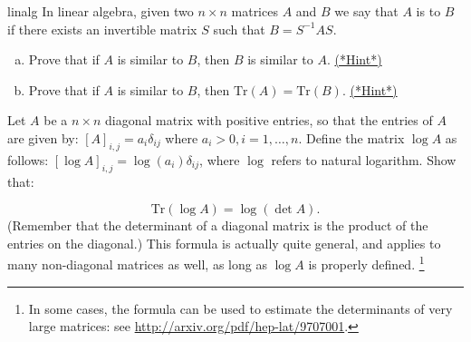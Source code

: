 \begin{exercise}{linalg}
In linear algebra, given two $n \times n$ matrices $A$ and $B$ we say that $A$ is  to $B$ if there exists an invertible matrix $S$ such that $B = S^{-1}AS$. 
\begin{enumerate}[(a)]
\item
Prove that if $A$ is similar to $B$, then $B$ is similar to $A$.
\hyperref[sec:sigma:hints]{(*Hint*)} 
\item
Prove that if $A$ is similar to $B$, then $\text{Tr} ({A}) = \text{Tr} ({B})$. 
\hyperref[sec:sigma:hints]{(*Hint*)} 
\end{enumerate}
\end{exercise}

\begin{exercise}{}
Let $A$ be a $n \times n$ diagonal matrix with positive entries, so that the entries of $A$ are given by:  $ [A]_{i,j} = a_{i} \delta_{ij}$ where $a_i > 0, i = 1, \ldots, n$.  Define the matrix $\log A$ as follows:  $ [\log A]_{i,j} = \log(a_{i}) \delta_{ij}$, where $\log$ refers to natural logarithm.  Show that:

\[ \text{Tr}(\log A) = \log (\det A). \]
(Remember that the determinant of a diagonal matrix is the product of the entries on the diagonal.)
This formula is actually quite general, and applies to many non-diagonal matrices as well, as long as $\log A$ is properly defined. \footnote{In some cases, the formula can be used to estimate the determinants of very large matrices: see \url{http://arxiv.org/pdf/hep-lat/9707001}.} 
\end{exercise}

